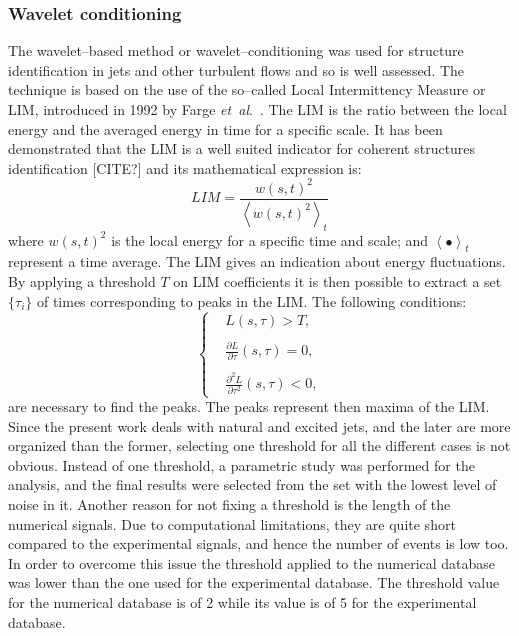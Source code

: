 \documentclass[english]{aiaa-tc}
\newcommand*{\etal}{\textit{et~al}.\ }
\begin{document}
\subsubsection{Wavelet conditioning}
The wavelet--based method or wavelet--conditioning was used for structure identification in jets and other turbulent flows \cite{Camussi1997,Camussi1997b,Guj1999,Camussi2002,Guj2003} and so is well assessed.
The technique is based on the use of the so--called Local Intermittency Measure or LIM, introduced in 1992 by Farge \etal \cite{Farge1992}.
The LIM is the ratio between the local energy and the averaged energy in time for a specific scale.
It has been demonstrated that the LIM is a well suited indicator for coherent structures identification [CITE?] and its mathematical expression is:
\begin{equation}
	\label{eqn:LIM}
	LIM = \frac{w(s, t)^{2}}{\left<w(s, t)^{2}\right>_{t}}
\end{equation}
where $w(s, t)^{2}$ is the local energy for a specific time and scale; and $\left< \bullet \right>_{t}$ represent a time average.
The LIM gives an indication about energy fluctuations. By applying a threshold $T$ on LIM coefficients it is then possible to
extract a set $\{\tau_{i}\}$ of times corresponding to peaks in the LIM. The following conditions:
\begin{equation} \label{eqn:thresholdLIM}
    \begin{cases}
        &L(s, \tau) > T,\\
        \\
        &\frac{\partial L}{\partial \tau}(s, \tau) = 0,\\
        \\
        &\frac{\partial^{2} L}{\partial \tau^{2}}(s, \tau) < 0,
    \end{cases}
\end{equation}
are necessary to find the peaks. The peaks represent then maxima of the LIM.
Since the present work deals with natural and excited jets, and the later are more organized than the former, selecting one threshold for all the different cases is not obvious.
Instead of one threshold, a parametric study was performed for the analysis, and the final results were selected from the set with the lowest level of noise in it. Another reason for not fixing
a threshold is the length of the numerical signals. Due to computational limitations, they are quite short compared to the experimental signals, and hence the number of events is low too. In order to overcome this issue
the threshold applied to the numerical database was lower than the one used for the experimental database.
The threshold value for the numerical database is of 2 while its value is of 5 for the experimental database.
\end{document}
